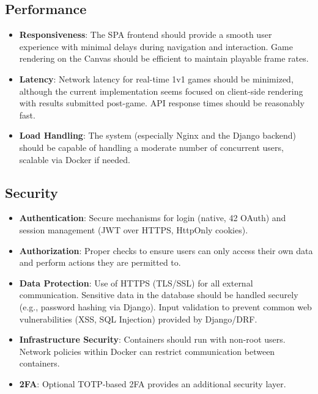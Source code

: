 \subsection*{Performance}
\begin{itemize}
    \item \textbf{Responsiveness}: The SPA frontend should provide a smooth user experience with minimal delays during navigation and interaction. Game rendering on the Canvas should be efficient to maintain playable frame rates.
    \item \textbf{Latency}: Network latency for real-time 1v1 games should be minimized, although the current implementation seems focused on client-side rendering with results submitted post-game. API response times should be reasonably fast.
    \item \textbf{Load Handling}: The system (especially Nginx and the Django backend) should be capable of handling a moderate number of concurrent users, scalable via Docker if needed.
\end{itemize}

\subsection*{Security}
\begin{itemize}
    \item \textbf{Authentication}: Secure mechanisms for login (native, 42 OAuth) and session management (JWT over HTTPS, HttpOnly cookies).
    \item \textbf{Authorization}: Proper checks to ensure users can only access their own data and perform actions they are permitted to.
    \item \textbf{Data Protection}: Use of HTTPS (TLS/SSL) for all external communication. Sensitive data in the database should be handled securely (e.g., password hashing via Django). Input validation to prevent common web vulnerabilities (XSS, SQL Injection) provided by Django/DRF.
    \item \textbf{Infrastructure Security}: Containers should run with non-root users. Network policies within Docker can restrict communication between containers.
    \item \textbf{2FA}: Optional TOTP-based 2FA provides an additional security layer.
\end{itemize}

